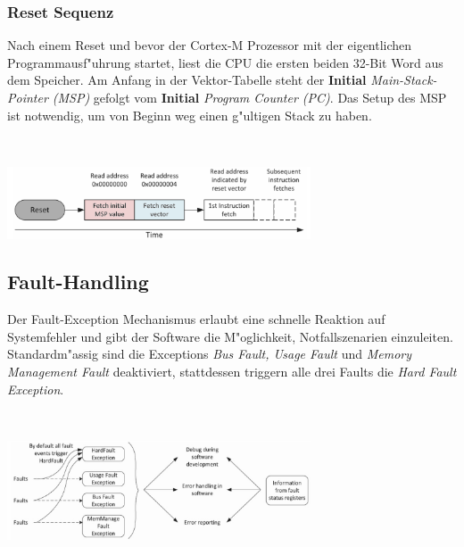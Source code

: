 \subsubsection{Reset Sequenz}
\begin{minipage}{9cm}
	Nach einem Reset und bevor der Cortex-M Prozessor mit der eigentlichen Programmausf"uhrung startet, liest die CPU die ersten beiden 32-Bit Word aus dem Speicher. Am Anfang in der Vektor-Tabelle steht der \textbf{Initial} \textit{Main-Stack-Pointer (MSP)} gefolgt vom \textbf{Initial} \textit{Program Counter (PC)}. Das Setup des MSP ist notwendig, um von Beginn weg einen g"ultigen Stack zu haben.
\end{minipage}
%
\begin{minipage}{0.5cm}
	\-\
\end{minipage}
%
\begin{minipage}{9cm}
	\includegraphics[width=9cm]{images/resetsequenz}
\end{minipage}

\subsection{Fault-Handling}
\begin{minipage}{9cm}
	Der Fault-Exception Mechanismus erlaubt eine schnelle Reaktion auf Systemfehler und gibt der Software die M"oglichkeit, Notfallszenarien einzuleiten. Standardm"assig sind die Exceptions \textit{Bus Fault, Usage Fault} und \textit{Memory Management Fault} deaktiviert, stattdessen triggern alle drei Faults die \textit{Hard Fault Exception}.
\end{minipage}
%
\begin{minipage}{0.5cm}
	\-\
\end{minipage}
%
\begin{minipage}{9cm}
	\includegraphics[width=9cm]{images/fault-handling}
\end{minipage}
    
